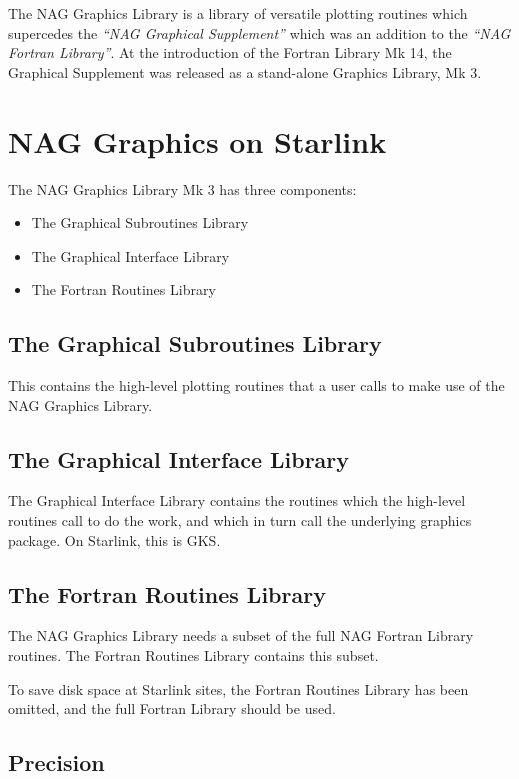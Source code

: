 The NAG Graphics Library is a library of versatile plotting
routines which supercedes the {\em ``NAG Graphical Supplement''\/} which was an
addition to the {\em ``NAG Fortran Library''\/}.
At the introduction of the Fortran Library Mk 14, the Graphical
Supplement was released as a stand-alone Graphics Library, Mk 3.

\section{NAG Graphics on Starlink}

The  NAG Graphics Library Mk 3 has three components:
\begin{itemize}
\item The Graphical Subroutines Library
\item The Graphical Interface Library
\item The Fortran Routines Library
\end{itemize}

\subsection{The Graphical Subroutines Library}

This contains the high-level plotting routines that a
user calls to make use of the NAG Graphics Library.

\subsection{The Graphical Interface Library}

The Graphical Interface Library contains the routines which the high-level
routines call to do the work, and which in turn call the underlying graphics
package. On Starlink, this is GKS.

\subsection{The Fortran Routines Library}

The NAG Graphics Library needs a subset of the full NAG Fortran Library
routines. The Fortran Routines Library contains this subset.

To save disk space at Starlink sites, the Fortran Routines Library has been
omitted, and the full Fortran Library should be used.

\subsection{Precision}

